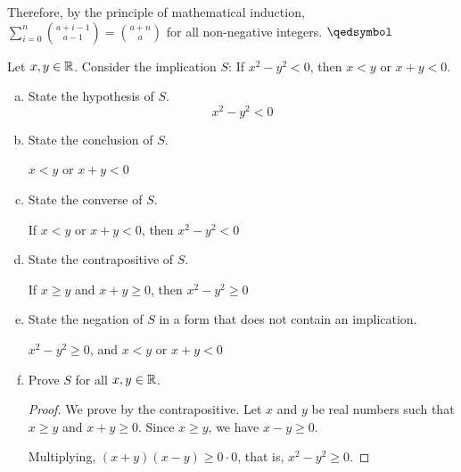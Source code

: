 Therefore, by the principle of mathematical induction,
$\sum_{i=0}^n\binom{a+i-1}{a-1} = \binom{a+n}{a}$
for all non-negative integers. $\qedsymbol$


\question Let $x,y\in\mathbb{R}$. Consider the implication $S$:
If $x^2-y^2 < 0$, then $x<y$ or $x+y < 0$.
\begin{enumerate}[(a)]
  \item State the hypothesis of $S$.
        \[ x^2-y^2 < 0 \]
  \item State the conclusion of $S$.
        \begin{center}
          $x<y$ or $x+y<0$
        \end{center}
  \item State the converse of $S$.
        \begin{center}
          If $x<y$ or $x+y<0$, then $x^2-y^2<0$
        \end{center}
  \item State the contrapositive of $S$.
        \begin{center}
          If $x\geq y$ and $x+y \geq 0$, then $x^2-y^2 \geq 0$
        \end{center}
  \item State the negation of $S$ in a form that does not contain an implication.
        \begin{center}
          $x^2-y^2 \geq 0$, and $x<y$ or $x+y<0$
        \end{center}
  \item Prove $S$ for all $x,y\in\mathbb{R}$.
        \begin{proof}
          We prove by the contrapositive.
          Let $x$ and $y$ be real numbers such that $x \geq y$ and $x+y \geq 0$.
          Since $x \geq y$, we have $x-y \geq 0$.

          Multiplying, $(x+y)(x-y) \geq 0\cdot 0$, that is, $x^2-y^2 \geq 0$.
        \end{proof}
\end{enumerate}


